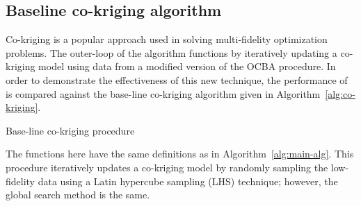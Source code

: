 
\subsection{Baseline co-kriging algorithm}
Co-kriging is a popular approach used in solving multi-fidelity optimization problems. The outer-loop of the \AlgName{} algorithm functions by iteratively updating a co-kriging model using data from a modified version of the OCBA procedure. In order to demonstrate the effectiveness of this new technique, the performance of \AlgName{} is compared against the base-line co-kriging algorithm given in Algorithm~\ref{alg:co-kriging}.


\begin{algorithm}[h!] 
\caption{Base-line co-kriging procedure}
\label{alg:co-kriging}
{\footnotesize
\begin{algorithmic}[1]
 
 
  
   
     
  \ENDIF
   
   
   
   
   
\ENDWHILE
\end{algorithmic}
}
\end{algorithm}

The functions here have the same definitions as in Algorithm~\ref{alg:main-alg}. This procedure iteratively updates a co-kriging model by randomly sampling the low-fidelity data using a Latin hypercube sampling (LHS) technique; however, the global search method is the same.

